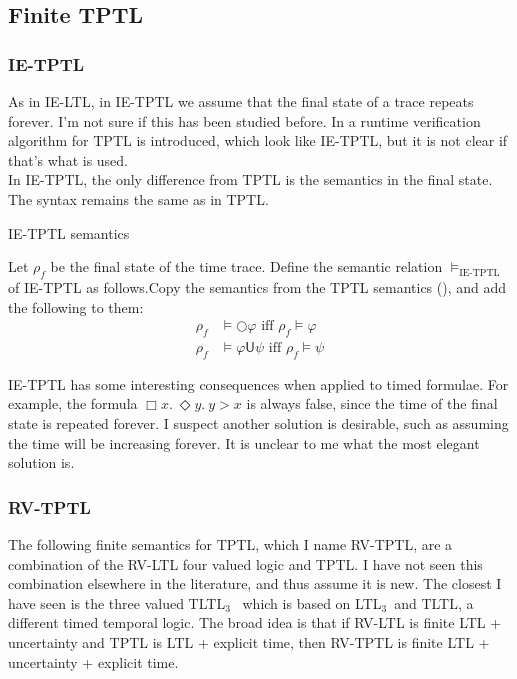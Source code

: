 \documentclass[a4paper]{article}
\newcommand{\U}{\mathsf{U}}
\newcommand{\tiff}{\text{ iff }}
\newcommand{\ltlt}{LTL$_3$}
\begin{document}
\subsection{Finite TPTL}

\subsubsection{IE-TPTL} As in IE-LTL, in IE-TPTL we assume that the final state of a trace repeats forever.  I'm not sure if this has been studied before. In \textcite{chai2013rewriting} a runtime verification algorithm for TPTL is introduced, which look like IE-TPTL, but it is not clear if that's what is used.\\
In IE-TPTL, the only difference from TPTL is the semantics in the final state. The syntax remains the same as in TPTL.

\begin{defn}{IE-TPTL semantics}

  Let $\rho_f$ be the final state of the time trace. Define the semantic relation $\vDash_{\text{IE-TPTL}}$ of IE-TPTL as follows.Copy the semantics from the TPTL semantics (), and add the following to them:
  \begin{align*}
    \rho_f &\vDash \bigcirc \varphi \tiff \rho_f \vDash \varphi\\
    \rho_f &\vDash \varphi \U \psi \tiff \rho_f \vDash \psi
  \end{align*}
\end{defn}

\begin{remk}
IE-TPTL has some interesting consequences when applied to timed formulae. For example, the formula $\Box x.~ \Diamond y.~ y > x$ is always false, since the time of the final state is repeated forever. I suspect another solution is desirable, such as assuming the time will be increasing forever. It is unclear to me what the most elegant solution is.
\end{remk}

\subsubsection{RV-TPTL} The following finite semantics for TPTL, which I name RV-TPTL, are a combination of the RV-LTL four valued logic and TPTL. I have not seen this combination elsewhere in the literature, and thus assume it is new. The closest I have seen is the three valued TLTL$_3$~\autocite[6]{arafat2005runtime} which is based on \ltlt\ and TLTL, a different timed temporal logic. The broad idea is that if RV-LTL is finite LTL + uncertainty and TPTL is LTL + explicit time, then RV-TPTL is finite LTL + uncertainty + explicit time.
\end{document}
